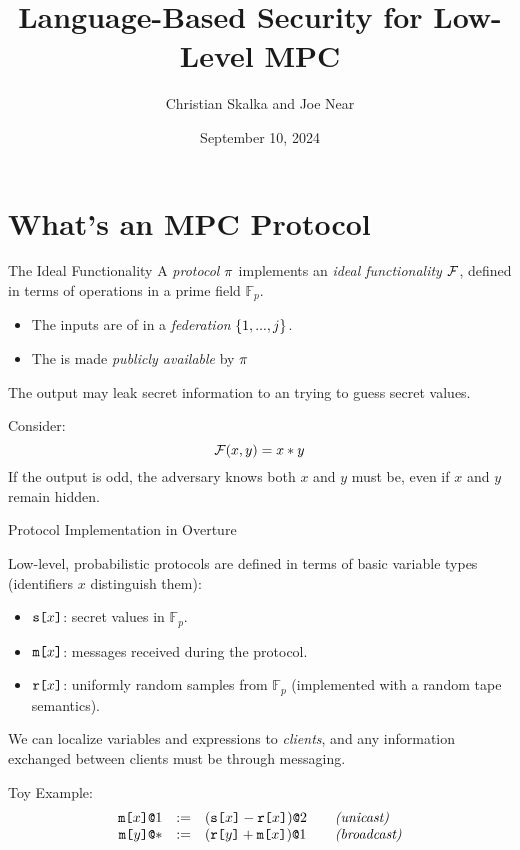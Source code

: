 \documentclass{beamer}
\title{Language-Based Security for Low-Level MPC}
\author{Christian Skalka and Joe Near}
\date{September 10, 2024}
\begin{document}
\begin{frame}
    \titlepage 
\end{frame}

\logo{}



\section{What's an MPC Protocol}

\begin{frame}{The Ideal Functionality}
  A \emph{protocol} $\pi$ implements an \emph{ideal functionality} $\mathcal{F}$,
  defined in terms of operations in a prime field $\mathbb{F}_p$.
  \begin{itemize}
  \item The inputs are  of  in a \emph{federation}
    $\{ 1,...,j \}$.
  \item The  is made \emph{publicly available} by $\pi$
  \end{itemize}
  The output may leak secret information to an  trying to
  guess secret values.

  \begin{exampleblock}{Consider:}
  $$
  \mathcal{F}(x,y) = x * y
  $$
  If the output is odd, the adversary knows both $x$ and $y$ must be, even
  if $x$ and $y$ remain hidden.
  \end{exampleblock}
  
\end{frame}
 
\begin{frame}{Protocol Implementation in Overture}

  Low-level, probabilistic protocols are defined in terms of basic variable types
  (identifiers $x$ distinguish them):
  \begin{itemize}
  \item $\texttt{s[}x\texttt{]}$: secret values in $\mathbb{F}_p$.
  \item $\texttt{m[}x\texttt{]}$: messages received during the protocol.
  \item $\texttt{r[}x\texttt{]}$: uniformly random samples from $\mathbb{F}_p$ (implemented with
    a random tape semantics).
  \end{itemize}
  We can localize variables and expressions to \emph{clients}, and any information
  exchanged between clients must be through messaging.
  \begin{exampleblock}{Toy Example:}
    $$
    \begin{array}{rcl@{\qquad}l}
      \mx{x}{1} &:=& \elab{(\secret{x} - \flip{x})}{2}  & \textit{(unicast)}\\
      \mx{y}{*} &:=& \elab{(\flip{y} + \mesg{x})}{1}  & \textit{(broadcast)}
    \end{array}
    $$ 
  \end{exampleblock}
\end{frame}
\end{document}
